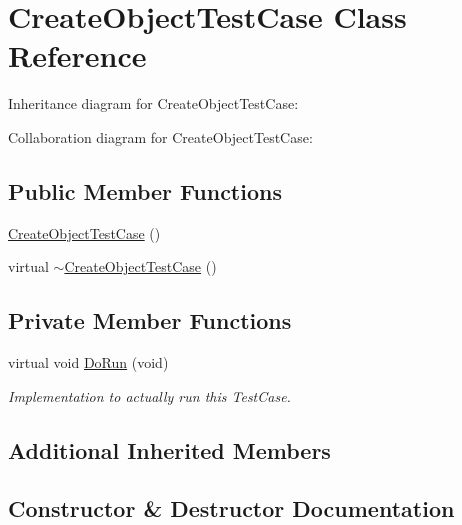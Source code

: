 \hypertarget{classCreateObjectTestCase}{}\section{Create\+Object\+Test\+Case Class Reference}
\label{classCreateObjectTestCase}


Inheritance diagram for Create\+Object\+Test\+Case\+:


Collaboration diagram for Create\+Object\+Test\+Case\+:
\subsection*{Public Member Functions}
\begin{DoxyCompactItemize}
\item 
\hyperlink{classCreateObjectTestCase_a157d7e1a333a0ab32f6f8c9666c42bfb}{Create\+Object\+Test\+Case} ()
\item 
virtual \hyperlink{classCreateObjectTestCase_a95fa1edf59c16d8785b092a973ac9036}{$\sim$\+Create\+Object\+Test\+Case} ()
\end{DoxyCompactItemize}
\subsection*{Private Member Functions}
\begin{DoxyCompactItemize}
\item 
virtual void \hyperlink{classCreateObjectTestCase_a562bfbe5de0afb55e775e4b4e28767f5}{Do\+Run} (void)
\begin{DoxyCompactList}\small\item\em Implementation to actually run this Test\+Case. \end{DoxyCompactList}\end{DoxyCompactItemize}
\subsection*{Additional Inherited Members}


\subsection{Constructor \& Destructor Documentation}
